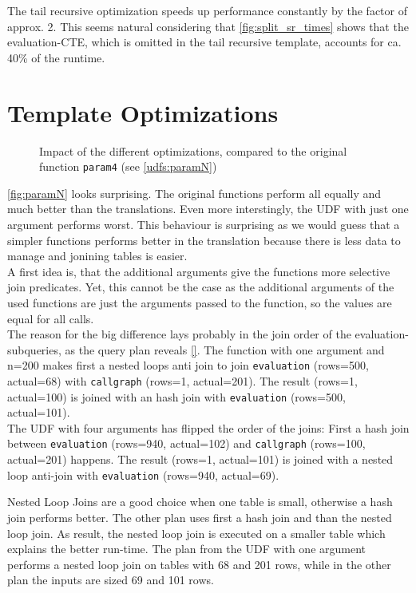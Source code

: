 The tail recursive optimization speeds up performance constantly by the factor of approx. 2. This seems natural considering that \autoref{fig:split_sr_times} shows that the evaluation-CTE, which is omitted in the tail recursive template, accounts for ca. 40\% of the runtime.

\section{Template Optimizations}


\begin{figure}[h!]
    \centering
    
    \caption{Impact of the different optimizations, compared to the original function \texttt{param4} (see \autoref{udfs:paramN})}
    \label{fig:paramN}
\end{figure}



\autoref{fig:paramN} looks surprising. The original functions perform all equally and much better than the translations. Even more interstingly, the UDF with just one argument performs worst. This behaviour is surprising as we would guess that a simpler functions performs better in the translation because there is less data to manage and jonining tables is easier.\\
A first idea is, that the additional arguments give the functions more selective join predicates. Yet, this cannot be the case as the additional arguments of the used functions are just the arguments passed to the function, so the values are equal for all calls.\\
The reason for the big difference lays probably in the join order of the evaluation-subqueries, as the query plan reveals \autoref{}. The function with one argument and n=200 makes first a nested loops anti join to join \texttt{evaluation} (rows=500, actual=68) with \texttt{callgraph} (rows=1, actual=201). The result (rows=1, actual=100) is joined with an hash join with \texttt{evaluation} (rows=500, actual=101).\\
The UDF with four arguments has flipped the order of the joins: First a hash join between \texttt{evaluation} (rows=940, actual=102) and \texttt{callgraph} (rows=100, actual=201) happens. The result (rows=1, actual=101) is joined with a nested loop anti-join with \texttt{evaluation} (rows=940, actual=69).

Nested Loop Joins are a good choice when one table is small, otherwise a hash join performs better. The other plan uses first a hash join and than the nested loop join. As result, the nested loop join is executed on a smaller table which explains the better run-time. The plan from the UDF with one argument performs a nested loop join on tables with 68 and 201 rows, while in the other plan the inputs are sized 69 and 101 rows.

